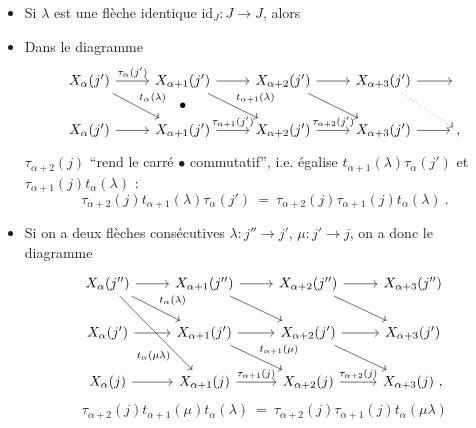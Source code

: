 \documentclass[11pt]{article}
\begin{document}
\begin{itemize}[leftmargin=3em]
\item[(i)] Si $\lambda$ est une flèche identique $\mathrm{id}_J : J\longrightarrow J$, alors  %
\item[(ii)] Dans le diagramme
\[
\begin{tikzcd}
X_\alpha(j') \arrow[r,"\tau_\alpha(j')"] \arrow[dr,"t_\alpha(\lambda)"] & X_{\alpha+1}(j') \arrow[r] \arrow[dr,"t_{\alpha+1}(\lambda)"] \arrow[d,phantom,"\bullet"] & X_{\alpha+2}(j') \arrow[r] \arrow[dr] & X_{\alpha+3}(j') \arrow[r] \arrow[dr,dotted] & {} \\
X_\alpha(j') \arrow[r] & X_{\alpha+1}(j') \arrow[r,"\tau_{\alpha+1}(j')"] & X_{\alpha+2}(j') \arrow[r,"\tau_{\alpha+2}(j')"] & X_{\alpha+3}(j') \arrow[r] & {,}
\end{tikzcd}
\] %
$\tau_{\alpha+2}(j)$ “rend le carré $\bullet$ commutatif”, i.e. égalise $t_{\alpha+1}(\lambda)\tau_\alpha(j')$ et $\tau_{\alpha+1}(j)t_\alpha(\lambda)$ :
\[
\boxed{\tau_{\alpha+2}(j)t_{\alpha+1}(\lambda)\tau_\alpha(j')\ =\ \tau_{\alpha+2}(j)\tau_{\alpha+1}(j)t_\alpha(\lambda)\ .}
\]
\item[(iii)] Si on a deux flèches consécutives $\lambda : j''\longrightarrow j'$, $\mu : j'\longrightarrow j$, on a donc le diagramme
\[
\begin{tikzcd}
X_\alpha(j'') \arrow[r] \arrow[dr,"t_\alpha(\lambda)"] \arrow[ddr,"t_\alpha(\mu\lambda)"{swap,pos=0.72,inner sep=1pt}] & X_{\alpha+1}(j'') \arrow[r] \arrow[dr] & X_{\alpha+2}(j'') \arrow[r] \arrow[dr] & X_{\alpha+3}(j'') \\
X_\alpha(j') \arrow[r] & X_{\alpha+1}(j') \arrow[r] \arrow[dr,"t_{\alpha+1}(\mu)"] & X_{\alpha+2}(j') \arrow[r] \arrow[dr] & X_{\alpha+3}(j') \\
X_\alpha(j) \arrow[r] & X_{\alpha+1}(j) \arrow[r,"\tau_{\alpha+1}(j)"] & X_{\alpha+2}(j) \arrow[r,"\tau_{\alpha+2}(j)"] & X_{\alpha+3}(j)\ ,
\end{tikzcd}
\]
\[
\boxed{\tau_{\alpha+2}(j)t_{\alpha+1}(\mu)t_\alpha(\lambda)\ =\ \tau_{\alpha+2}(j)\tau_{\alpha+1}(j)t_\alpha(\mu\lambda)}
\]
\end{itemize}
\end{document}
